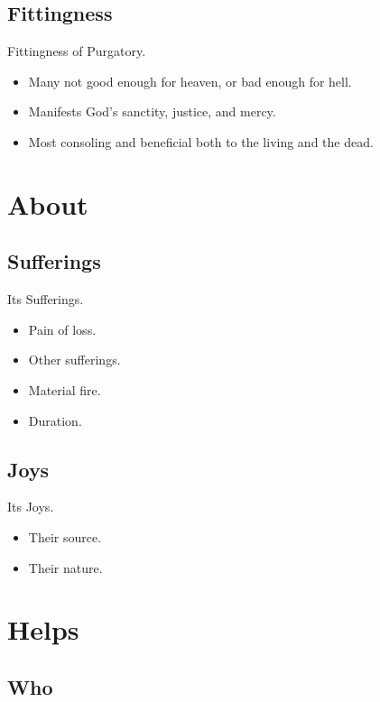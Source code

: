 \documentclass{beamer}
\begin{document}
\subsection{Fittingness}

\begin{frame}{Fittingness of Purgatory.}
\begin{itemize}
 \item Many not good enough for heaven, or bad enough for hell.
 \item Manifests God's sanctity, justice, and mercy.
 \item Most consoling and beneficial both to the living and the dead.
\end{itemize}
\end{frame}

\section{About}
\subsection{Sufferings}

\begin{frame}{Its Sufferings.}
\begin{itemize}
 \item Pain of loss. 
 \item Other sufferings.
 \item Material fire.
 \item Duration.
\end{itemize}
\end{frame}

\subsection{Joys}

\begin{frame}{Its Joys.}
\begin{itemize}
 \item Their source.
 \item Their nature.
\end{itemize}
\end{frame}

\section{Helps}

\subsection{Who}
\end{document}
